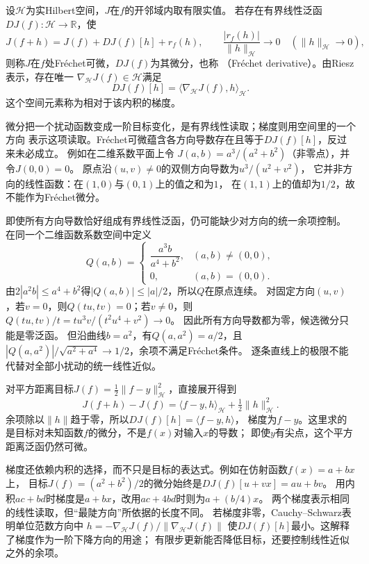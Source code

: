 \begin{definition}[函数泛函的Fréchet微分与梯度]
\label{def:functional-frechet-gradient}
设$\mathcal H$为实Hilbert空间，$J$在$f$的开邻域内取有限实值。
若存在有界线性泛函$DJ(f):\mathcal H\to\mathbb R$，使
\[
 J(f+h)=J(f)+DJ(f)[h]+r_f(h),\qquad
 \frac{|r_f(h)|}{\lVert h\rVert_{\mathcal H}}\longrightarrow0
 \quad(\lVert h\rVert_{\mathcal H}\to0),
\]
则称$J$在$f$处Fréchet可微，$DJ(f)$为其微分，也称
（Fréchet derivative）。由Riesz表示，存在唯一
$\nabla_{\mathcal H}J(f)\in\mathcal H$满足
\[
 DJ(f)[h]=\langle\nabla_{\mathcal H}J(f),h\rangle_{\mathcal H}.
\]
这个空间元素称为相对于该内积的梯度。
\end{definition}
微分把一个扰动函数变成一阶目标变化，是有界线性读取；梯度则用空间里的一个方向
表示这项读取。Fréchet可微蕴含各方向导数存在且等于$DJ(f)[h]$，反过来未必成立。
例如在二维系数平面上令
$J(a,b)=a^3/(a^2+b^2)$（非零点），并令$J(0,0)=0$。
原点沿$(u,v)\neq0$的双侧方向导数为$u^3/(u^2+v^2)$，
它并非方向的线性函数：在$(1,0)$与$(0,1)$上的值之和为$1$，
在$(1,1)$上的值却为$1/2$，故不能作为Fréchet微分。

即使所有方向导数恰好组成有界线性泛函，仍可能缺少对方向的统一余项控制。
在同一个二维函数系数空间中定义
\[
 Q(a,b)=
 \begin{cases}
  \dfrac{a^3b}{a^4+b^2},&(a,b)\neq(0,0),\\
  0,&(a,b)=(0,0).
 \end{cases}
\]
由$2|a^2b|\leq a^4+b^2$得$|Q(a,b)|\leq|a|/2$，所以$Q$在原点连续。
对固定方向$(u,v)$，若$v=0$，则$Q(tu,tv)=0$；若$v\neq0$，则
$Q(tu,tv)/t=t u^3v/(t^2u^4+v^2)\to0$。
因此所有方向导数都为零，候选微分只能是零泛函。
但沿曲线$b=a^2$，有$Q(a,a^2)=a/2$，且
$|Q(a,a^2)|/\sqrt{a^2+a^4}\to1/2$，余项不满足Fréchet条件。
逐条直线上的极限不能代替对全部小扰动的统一线性近似。

对平方距离目标$J(f)=\frac12\lVert f-y\rVert_{\mathcal H}^2$，直接展开得到
\[
 J(f+h)-J(f)
 =\langle f-y,h\rangle_{\mathcal H}+\tfrac12\lVert h\rVert_{\mathcal H}^2.
\]
余项除以$\lVert h\rVert$趋于零，所以$DJ(f)[h]=\langle f-y,h\rangle$，
梯度为$f-y$。这里求的是目标对未知函数$f$的微分，不是$f(x)$对输入$x$的导数；
即使$y$有尖点，这个平方距离泛函仍然可微。

梯度还依赖内积的选择，而不只是目标的表达式。例如在仿射函数$f(x)=a+bx$上，
目标$J(f)=(a^2+b^2)/2$的微分始终是$DJ(f)[u+vx]=au+bv$。
用内积$ac+bd$时梯度是$a+bx$，改用$ac+4bd$时则为$a+(b/4)x$。
两个梯度表示相同的线性读取，但“最陡方向”所依据的长度不同。
若梯度非零，Cauchy--Schwarz表明单位范数方向中
$h=-\nabla_{\mathcal H}J(f)/\lVert\nabla_{\mathcal H}J(f)\rVert$
使$DJ(f)[h]$最小。这解释了梯度作为一阶下降方向的用途；
有限步更新能否降低目标，还要控制线性近似之外的余项。

